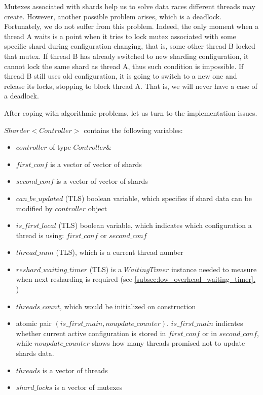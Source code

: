 \documentclass{article}
\newcommand*{\fullref}[1]{\hyperref[{#1}]{\ref*{#1}. \nameref*{#1}}}
\begin{document}
Mutexes associated with shards help us to solve data races different threads may create. However, another possible problem arises, which is a deadlock. Fortunately, we do not suffer from this problem. Indeed, the only moment when a thread A waits is a point when it tries to lock mutex associated with some specific shard during configuration changing, that is, some other thread B locked that mutex. If thread B has already switched to new sharding configuration, it cannot lock the same shard as thread A, thus such condition is impossible. If thread B still uses old configuration, it is going to switch to a new one and release its locks, stopping to block thread A. That is, we will never have a case of a deadlock.

After coping with algorithmic problems, let us turn to the implementation issues.

$Sharder<Controller>$ contains the following variables:
\begin{itemize}
	\item $controller$ of type $Controller\&$
	\item $first\_conf$ is a vector of vector of shards
	\item $second\_conf$ is a vector of vector of shards
	\item $can\_be\_updated$ (TLS) boolean variable, which specifies if shard data can be modified by $controller$ object
	\item $is\_first\_local$ (TLS) boolean variable, which indicates which configuration a thread is using: $first\_conf$ or $second\_conf$
	\item $thread\_num$ (TLS), which is a current thread number
	\item $reshard\_waiting\_timer$ (TLS) is a $WaitingTimer$ instance needed to measure when next resharding is required (see \fullref{subsec:low_overhead_waiting_timer})
	\item $threads\_count$, which would be initialized on construction
	\item atomic pair $(is\_first\_main, noupdate\_counter)$. $is\_first\_main$ indicates whether current active configuration is stored in $first\_conf$ or in $second\_conf$, while $noupdate\_counter$ shows how many threads promised not to update shards data.
	\item $threads$ is a vector of threads
	\item $shard\_locks$ is a vector of mutexes
\end{itemize}
\end{document}
